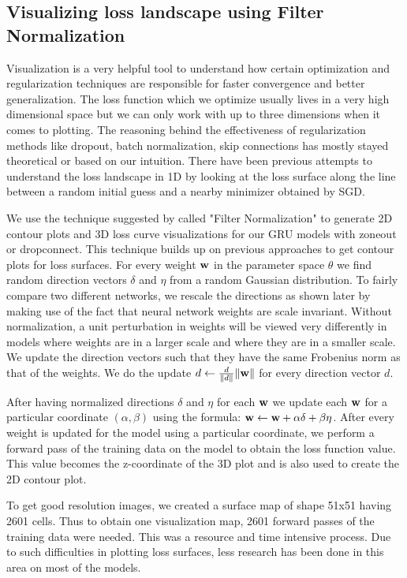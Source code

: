 \documentclass{article}
\begin{document}
\subsection{Visualizing loss landscape using Filter Normalization}
Visualization is a very helpful tool to understand how certain optimization and regularization techniques are responsible for faster convergence and better generalization. The loss function which we optimize usually lives in a very high dimensional space but we can only work with up to three dimensions when it comes to plotting. The reasoning behind the effectiveness of regularization methods like dropout, batch normalization, skip connections has mostly stayed theoretical or based on our intuition. There have been previous attempts \cite{goodfellow2015qualitatively} to understand the loss landscape in 1D by looking at the loss surface along the line between a random initial guess and a nearby minimizer obtained by SGD.

We use the technique suggested by \cite{li2018visualizing} called "Filter Normalization" to generate 2D contour plots and 3D loss curve visualizations for our GRU models with zoneout or dropconnect. This technique builds up on previous approaches to get contour plots for loss surfaces. For every weight $\bf{w}$ in the parameter space $\theta$ we find random direction vectors $\delta$ and $\eta$ from a random Gaussian distribution. To fairly compare two different networks, we rescale the directions as shown later by making use of the fact that neural network weights are scale invariant. Without normalization, a unit perturbation in weights will be viewed very differently in models where weights are in a larger scale and where they are in a smaller scale. We update the direction vectors such that they have the same Frobenius norm as that of the weights. We do the update $d \leftarrow \frac{d}{\Vert d\Vert} \Vert \bf{w}\Vert$ for every direction vector $d$. 

After having normalized directions $\delta$ and $\eta$ for each $\bf{w}$ we update each $\bf{w}$ for a particular coordinate $(\alpha, \beta)$ using the formula: $\bf{w} \leftarrow \bf{w} + \alpha\delta + \beta\eta$. After every weight is updated for the model using a particular coordinate, we perform a forward pass of the training data on the model to obtain the loss function value. This value becomes the z-coordinate of the 3D plot and is also used to create the 2D contour plot.

To get good resolution images, we created a surface map of shape 51x51 having 2601 cells. Thus to obtain one visualization map, 2601 forward passes of the training data were needed. This was a resource and time intensive process. Due to such difficulties in plotting loss surfaces, less research has been done in this area on most of the models.
\end{document}
